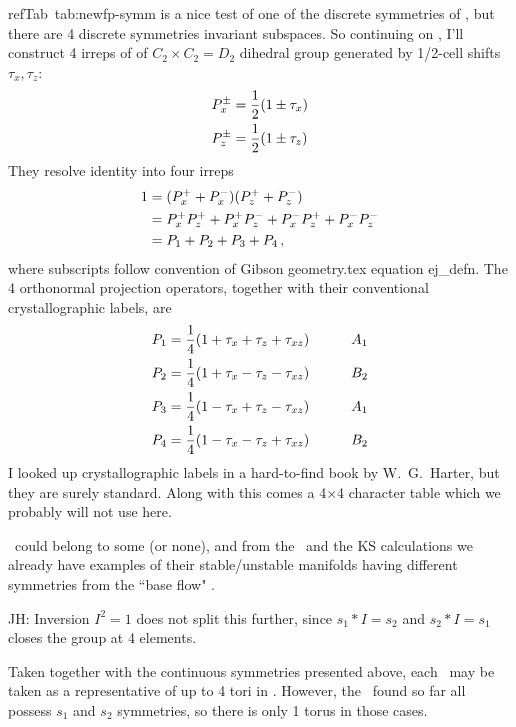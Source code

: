  refTab~{tab:newfp-symm}
is a nice test of one of the discrete symmetries of \pCf, but there are 4
discrete symmetries invariant subspaces.
So continuing on , I'll construct 4 irreps of of $C_2
\times C_2 = D_2$ dihedral group generated by 1/2-cell shifts $\tau_x,
\tau_z$:
\begin{align}
P_x^\pm &= \frac{1}{2}(1 \pm \tau_x)
    \nonumber \\ 
P_z^\pm &= \frac{1}{2}(1 \pm \tau_z)
\end{align}
They resolve identity into four irreps
\begin{align}
1 &= ({P}_x^+ + {P}_x^-) ({P}_z^+ + {P}_z^-)
    \nonumber \\ 
  &=  {P}_x^+ {P}_z^+
   +  {P}_x^+ {P}_z^-
   +  {P}_x^- {P}_z^+
   +  {P}_x^- {P}_z^-
    \nonumber \\ 
  &= {P}_1 + {P}_2 + {P}_3 + {P}_4
    \,,
\label{projOp:tau1}
\end{align}
where subscripts follow convention of Gibson geometry.tex equation
ej\_defn. The 4 orthonormal projection operators, together with their
conventional crystallographic labels, are
\begin{align}
P_1 &= \frac{1}{4}({1} + \tau_x + \tau_z + \tau_{xz})
    & \qquad    A_1
    \nonumber \\ 
P_2 &= \frac{1}{4}({1} + \tau_x - \tau_z - \tau_{xz})
    & \qquad    B_2
    \nonumber \\ 
P_3 &= \frac{1}{4}({1} - \tau_x + \tau_z - \tau_{xz})
    & \qquad    A_1
    \nonumber \\ 
P_4 &= \frac{1}{4}({1} - \tau_x - \tau_z + \tau_{xz})
    & \qquad    B_2
\label{projOp:taus}
\end{align}
I looked up crystallographic labels in a hard-to-find book by
W.~G.~Harter, but they are surely standard. Along with this comes a
4$\times$4 character table which we probably will not use here.

\Eqva\ could belong to some (or none), and from the \ubranch\ and the KS
calculations we already have examples of their stable/unstable manifolds
having different symmetries from the ``base flow" \eqv.

JH:{ Inversion  $I^2=1$ does not split this further, since
$s_1*I = s_2$ and $s_2*I=s_1$ closes the group at 4 elements.
   }

Taken together with the continuous symmetries presented above, each
\eqva\ may be taken as a representative of up to 4 tori in \statesp .
However, the \eqva\ found so far all possess $s_1$ and $s_2$ symmetries,
so there is only 1 torus in those cases.

